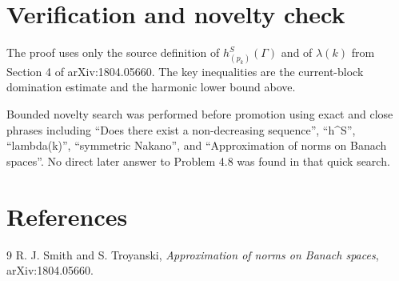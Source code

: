 \documentclass[11pt]{amsart}
\begin{document}
\section*{Verification and novelty check}

The proof uses only the source definition of $h^S_{(p_k)}(\Gamma)$ and of
$\lambda(k)$ from Section 4 of arXiv:1804.05660.  The key inequalities are the
current-block domination estimate and the harmonic lower bound above.

Bounded novelty search was performed before promotion using exact and close
phrases including ``Does there exist a non-decreasing sequence'', ``h\^{}S'',
``lambda(k)'', ``symmetric Nakano'', and ``Approximation of norms on Banach
spaces''.  No direct later answer to Problem 4.8 was found in that quick search.

\section*{References}

\begin{thebibliography}{9}
R. J. Smith and S. Troyanski,
\emph{Approximation of norms on Banach spaces},
arXiv:1804.05660.
\end{thebibliography}
\end{document}

